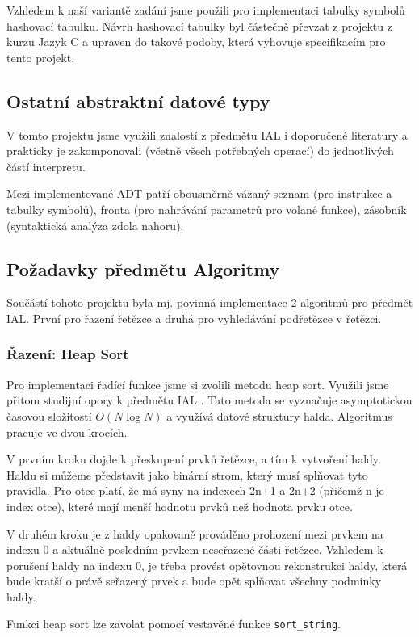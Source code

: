 \documentclass[12pt,a4paper]{article}
\begin{document}
Vzhledem k naší variantě zadání jsme použili pro implementaci tabulky symbolů hashovací tabulku. Návrh hashovací tabulky byl částečně převzat z projektu z kurzu Jazyk C \cite{ijc} a upraven do takové podoby, která vyhovuje specifikacím pro tento projekt.


\subsection{Ostatní abstraktní datové typy}
V tomto projektu jsme využili znalostí z předmětu IAL \cite{ial_skripta} i doporučené literatury \cite{algoritmy} a prakticky je zakomponovali (včetně všech potřebných operací) do jednotlivých částí interpretu. 

Mezi implementované ADT patří obousměrně vázaný seznam (pro instrukce a tabulky symbolů), fronta (pro nahrávání parametrů pro volané funkce), zásobník (syntaktická analýza zdola nahoru).


\subsection{Požadavky předmětu Algoritmy}
Součástí tohoto projektu byla mj. povinná implementace 2 algoritmů pro předmět IAL. První pro řazení řetězce a druhá pro vyhledávání podřetězce v řetězci.

\subsubsection{Řazení: Heap Sort}
Pro implementaci řadící funkce jsme si zvolili metodu heap sort. Využili jsme přitom studijní opory k předmětu IAL \cite{ial_skripta}.  
Tato metoda se vyznačuje asymptotickou časovou složitostí $O(N \log N)$ a využívá datové struktury halda. Algoritmus pracuje ve dvou krocích. 

V prvním kroku dojde k přeskupení prvků řetězce, a tím k vytvoření haldy. Haldu si můžeme představit jako binární strom, který musí splňovat tyto pravidla. Pro otce platí, že má syny na indexech 2n+1 a 2n+2 (přičemž n je index otce), které mají menší hodnotu prvků než hodnota prvku otce.  

V druhém kroku je z haldy opakovaně prováděno prohození mezi prvkem na indexu 0 a aktuálně posledním prvkem neseřazené části řetězce. Vzhledem k porušení haldy na indexu 0, je třeba provést opětovnou rekonstrukci haldy, která bude kratší o právě seřazený prvek a bude opět splňovat všechny podmínky haldy.
 
Funkci heap sort lze zavolat pomocí vestavěné funkce \verb|sort_string|. 
\end{document}

